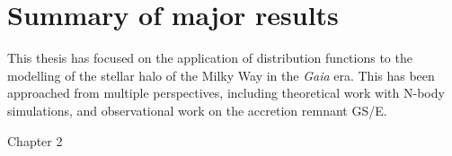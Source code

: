 \section{Summary of major results}

This thesis has focused on the application of distribution functions to the modelling of the stellar halo of the Milky Way in the \textit{Gaia} era. This has been approached from multiple perspectives, including theoretical work with N-body simulations, and observational work on the accretion remnant GS/E. 

Chapter 2 



